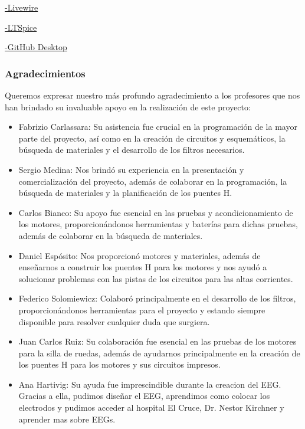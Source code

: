 \documentclass{article}
\begin{document}
    \href{https://livewire.laravel.com/}{-Livewire}
    \newline

    \href{https://www.analog.com/en/resources/design-tools-and-calculators/ltspice-simulator.html}{-LTSpice}
    \newline

    \href{https://github.com/apps/desktop}{-GitHub Desktop}

\subsubsection{Agradecimientos}

Queremos expresar nuestro más profundo agradecimiento a los profesores que nos han brindado su invaluable apoyo en la realización de este proyecto:
\begin{itemize}
    \item Fabrizio Carlassara: Su asistencia fue crucial en la programación de la mayor parte del proyecto, así como en la creación de circuitos y esquemáticos, la búsqueda de materiales y el desarrollo de los filtros necesarios.
    \item Sergio Medina: Nos brindó su experiencia en la presentación y comercialización del proyecto, además de colaborar en la programación, la búsqueda de materiales y la planificación de los puentes H.
    \item Carlos Bianco: Su apoyo fue esencial en las pruebas y acondicionamiento de los motores, proporcionándonos herramientas y baterías para dichas pruebas, además de colaborar en la búsqueda de materiales.
    \item Daniel Espósito: Nos proporcionó motores y materiales, además de enseñarnos a construir los puentes H para los motores y nos ayudó a solucionar problemas con las pistas de los circuitos para las altas corrientes.
    \item Federico Solomiewicz: Colaboró principalmente en el desarrollo de los filtros, proporcionándonos herramientas para el proyecto y estando siempre disponible para resolver cualquier duda que surgiera.
    \item Juan Carlos Ruiz: Su colaboración fue esencial en las pruebas de los motores para la silla de ruedas, además de ayudarnos principalmente en la creación de los puentes H para los motores y sus circuitos impresos.
    \item Ana Hartivig: Su ayuda fue imprescindible durante la creacion del EEG. Gracias a ella, pudimos diseñar el EEG, aprendimos como colocar los electrodos y pudimos acceder al hospital El Cruce, Dr. Nestor Kirchner y aprender mas sobre EEGs.
\end{itemize}
\end{document}
